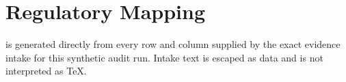 \section{Regulatory Mapping}

 is generated directly from every row and column supplied by the exact evidence intake for this synthetic audit run. Intake text is escaped as data and is not interpreted as TeX.


